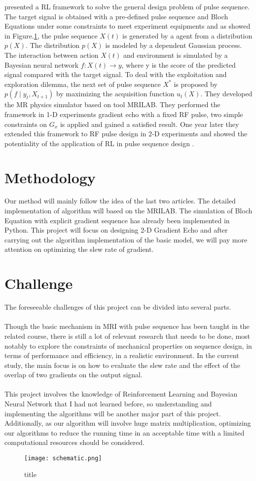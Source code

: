 \citet{0477} presented a RL framework to solve the general design problem of pulse sequence. The target signal is obtained with a pre-defined pulse sequence and Bloch Equations under some constraints to meet experiment equipments and as showed in Figure.\ref{schematic}, the pulse sequence $X(t)$ is generated by a agent from a distribution $p(X)$. The distribution $p(X)$ is modeled by a dependent Gaussian process. The interaction between action $X(t)$ and environment is simulated by a Bayesian neural network $f:X(t) \rightarrow y$, where y is the score of the predicted signal compared with the target signal. To deal with the exploitation and exploration dilemma, the next set of pulse sequence $X^*$ is proposed by $p\left(f \mid y_t, X_{t+1}\right)$ by maximizing the acquisition function $u_t(X)$. They developed the MR physics simulator based on tool MRILAB. They performed the framework in 1-D experiments gradient echo with a fixed RF pulse, two simple constraints on $G_x$ is applied and gained a satisfied result. One year later they extended this framework to RF pulse design in 2-D experiments and showed the potentiality of the application of RL in pulse sequence design \cite{0438}.

\section{Methodology}

Our method will mainly follow the idea of the last two articles. The detailed implementation of algorithm will based on the MRILAB. The simulation of Bloch Equation with explicit gradient sequence has already been implemented in Python. This project will focus on designing 2-D Gradient Echo and after carrying out the algorithm implementation of the basic model, we will pay more attention on optimizing the slew rate of gradient.

\section{Challenge}

The foreseeable challenges of this project can be divided into several parts.
\\\\
Though the basic mechanism in MRI with pulse sequence has been taught in the related course, there is still a lot of relevant research that needs to be done, most notably to explore the constraints of mechanical properties on sequence design, in terms of performance and efficiency, in a realistic environment. In the current study, the main focus is on how to evaluate the slew rate and the effect of the overlap of two gradients on the output signal.
\\\\
This project involves the knowledge of Reinforcement Learning and Bayesian Neural Network that I had not learned before, so understanding and implementing the algorithms will be another major part of this project. Additionally, as our algorithm will involve huge matrix multiplication, optimizing our algorithms to reduce the running time in an acceptable time with a limited computational resources should be considered.

\begin{figure}[ht]
    \centering
    \texttt{[image: schematic.png]}
    \caption{title}
    \label{schematic}
\end{figure}